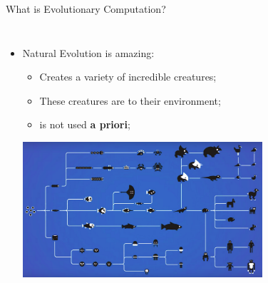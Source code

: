 \documentclass[aspectratio=169]{beamer}
\begin{document}
\begin{frame}[t]{What is Evolutionary Computation?}
  \begin{columns}
    \begin{itemize}
      \item Natural Evolution is amazing:
      \begin{itemize}
        \item Creates a variety of incredible creatures;
        \item These creatures are  to their environment;
        \item {} is not used {\bf a priori};
      \end{itemize}
      \includegraphics[width=0.7\textwidth]{img/OEE_Nature.png}


\end{itemize}
\end{columns}
\end{frame}
\end{document}
